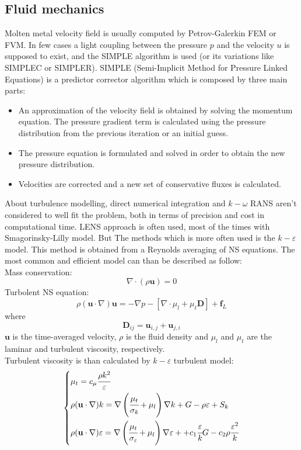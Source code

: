 \subsection{Fluid mechanics}
Molten metal velocity field is usually computed by Petrov-Galerkin FEM or FVM. In few cases a light coupling between the pressure $p$ and the velocity $u$ is supposed to exist, and the SIMPLE algorithm is used (or its variations like SIMPLEC or SIMPLER). SIMPLE (Semi-Implicit Method for Pressure Linked Equations) is a predictor corrector algorithm which is composed by three main parts:
\begin{itemize}

\item An approximation of the velocity field is obtained by solving the momentum equation. The pressure gradient term is calculated using the pressure distribution from the previous iteration or an initial guess.
\item The pressure equation is formulated and solved in order to obtain the new pressure distribution.
\item Velocities are corrected and a new set of conservative fluxes is calculated. 
\end{itemize}
About turbulence modelling, direct numerical integration and $k-\omega$ RANS aren't considered to well fit the problem, both in terms of precision and cost in computational time. LENS approach is often used, most of the times with Smagorinsky-Lilly model. But The methods which is more often used is the $k-\varepsilon$ model. This method is obtained from a Reynolds averaging of NS equations. The most common and efficient model can than be described as follow:\\
Mass conservation:
\begin{equation}
\nabla \cdot (\rho \textbf{u})=0
\end{equation}
Turbolent NS equation:
\begin{equation}
\rho(\textbf{u}\cdot \nabla )\textbf{u}=-\nabla p -[ \nabla\cdot \mu_l + \mu_t \textbf{D}]+\textbf{f}_L
\end{equation}
where
\begin{equation}
\textbf{D}_{ij}=\textbf{u}_{i,j}+\textbf{u}_{j,i}
\end{equation}
$\textbf{u}$ is the time-averaged velocity, $\rho $ is the fluid density and $\mu_l$ and $\mu_t$ are the laminar and turbulent viscosity, respectively.\\
Turbulent viscosity is than calculated by $k-\varepsilon$ turbulent model:
\begin{equation}
\left\{
\begin{aligned}
&\mu_t=c_{\mu} \cfrac{\rho k^2}{\varepsilon}\\
&\rho(\textbf{u}\cdot \nabla)k=\nabla \left( \cfrac{\mu_t}{\sigma_k}+\mu_l \right)\nabla k + G - \rho \varepsilon + S_k\\
&\rho(\textbf{u}\cdot \nabla)\varepsilon=\nabla \left( \cfrac{\mu_t}{\sigma_{\varepsilon}}+\mu_l \right)\nabla \varepsilon ++c_1 \cfrac{\varepsilon}{k}G - c_2\rho \cfrac{\varepsilon^2}{k}\\
\end{aligned}
\right.
\end{equation}
